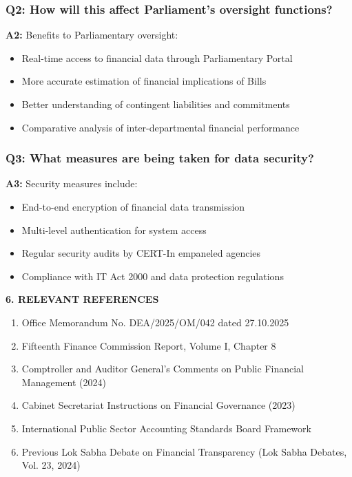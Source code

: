 \documentclass[12pt,a4paper]{article}
\newcommand{\sectionheader}[1]{\textbf{#1}}
\begin{document}
\subsubsection*{Q2: How will this affect Parliament's oversight functions?}
\textbf{A2:} Benefits to Parliamentary oversight:
\begin{itemize}[leftmargin=*, itemsep=2pt]
    \item Real-time access to financial data through Parliamentary Portal
    \item More accurate estimation of financial implications of Bills
    \item Better understanding of contingent liabilities and commitments
    \item Comparative analysis of inter-departmental financial performance
\end{itemize}

\subsubsection*{Q3: What measures are being taken for data security?}
\textbf{A3:} Security measures include:
\begin{itemize}[leftmargin=*, itemsep=2pt]
    \item End-to-end encryption of financial data transmission
    \item Multi-level authentication for system access
    \item Regular security audits by CERT-In empaneled agencies
    \item Compliance with IT Act 2000 and data protection regulations
\end{itemize}

\vspace{0.5cm}

\sectionheader{6. RELEVANT REFERENCES}

\begin{enumerate}[leftmargin=*, itemsep=2pt]
    \item Office Memorandum No. DEA/2025/OM/042 dated 27.10.2025
    \item Fifteenth Finance Commission Report, Volume I, Chapter 8
    \item Comptroller and Auditor General's Comments on Public Financial Management (2024)
    \item Cabinet Secretariat Instructions on Financial Governance (2023)
    \item International Public Sector Accounting Standards Board Framework
    \item Previous Lok Sabha Debate on Financial Transparency (Lok Sabha Debates, Vol. 23, 2024)
\end{enumerate}
\end{document}

